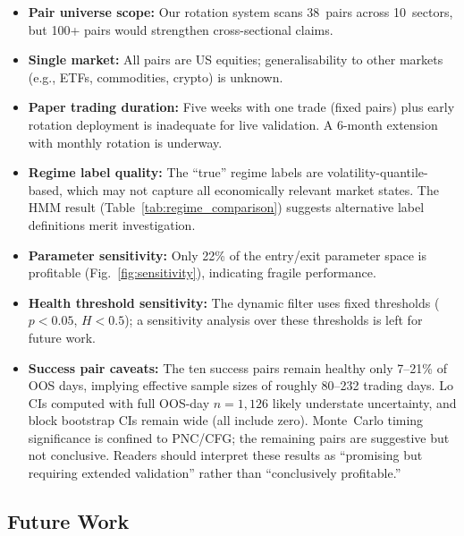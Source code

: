 \documentclass{ieeeaccess}
\begin{document}
\begin{itemize}
    \item \textbf{Pair universe scope:} Our rotation system scans 38~pairs across 10~sectors, but 100+ pairs would strengthen cross-sectional claims.
    \item \textbf{Single market:} All pairs are US equities; generalisability to other markets (e.g., ETFs, commodities, crypto) is unknown.
    \item \textbf{Paper trading duration:} Five weeks with one trade (fixed pairs) plus early rotation deployment is inadequate for live validation.
    A 6-month extension with monthly rotation is underway.
    \item \textbf{Regime label quality:} The ``true'' regime labels are volatility-quantile-based, which may not capture all economically relevant market states.
    The HMM result (Table~\ref{tab:regime_comparison}) suggests alternative label definitions merit investigation.
    \item \textbf{Parameter sensitivity:} Only 22\% of the entry/exit parameter space is profitable (Fig.~\ref{fig:sensitivity}), indicating fragile performance.
    \item \textbf{Health threshold sensitivity:} The dynamic filter uses fixed thresholds ($p < 0.05$, $H < 0.5$); a sensitivity analysis over these thresholds is left for future work.
    \item \textbf{Success pair caveats:} The ten success pairs remain healthy only 7--21\% of OOS days, implying effective sample sizes of roughly 80--232 trading days.
    Lo CIs computed with full OOS-day $n=1{,}126$ likely understate uncertainty, and block bootstrap CIs remain wide (all include zero).
    Monte~Carlo timing significance is confined to PNC/CFG; the remaining pairs are suggestive but not conclusive.
    Readers should interpret these results as ``promising but requiring extended validation'' rather than ``conclusively profitable.''
\end{itemize}

\subsection{Future Work}
\end{document}
